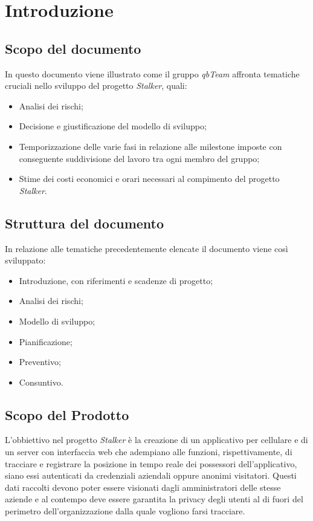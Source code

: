 \section{Introduzione}
\subsection{Scopo del documento}
In questo documento viene illustrato come  il gruppo \textit{qbTeam} affronta tematiche cruciali nello sviluppo del progetto \textit{Stalker}, quali:
\begin{itemize}
    \item Analisi dei rischi;
    \item Decisione e giustificazione del modello di sviluppo;
    \item Temporizzazione delle varie fasi in relazione alle milestone imposte con conseguente suddivisione del lavoro tra ogni membro del gruppo;
    \item Stime dei costi economici e orari necessari al compimento del progetto \textit{Stalker}.
\end{itemize}

\subsection{Struttura del documento}
In relazione alle tematiche precedentemente elencate il documento viene così sviluppato:
\begin{itemize}
    \item Introduzione, con riferimenti e scadenze di progetto;
    \item Analisi dei rischi;
    \item Modello di sviluppo;
    \item Pianificazione;
    \item Preventivo;
    \item Consuntivo.
\end{itemize}

\subsection{Scopo del Prodotto}
L'obbiettivo nel progetto \textit{Stalker} è la creazione di un applicativo per cellulare e di un server con interfaccia web che adempiano alle funzioni, rispettivamente, di 
tracciare e registrare la posizione in tempo reale dei possessori dell'applicativo, siano essi autenticati da credenziali aziendali oppure anonimi visitatori.
Questi dati raccolti devono poter essere visionati dagli amministratori delle stesse aziende e al contempo deve essere garantita la privacy degli utenti al di fuori del perimetro dell'organizzazione dalla quale vogliono farsi tracciare.

